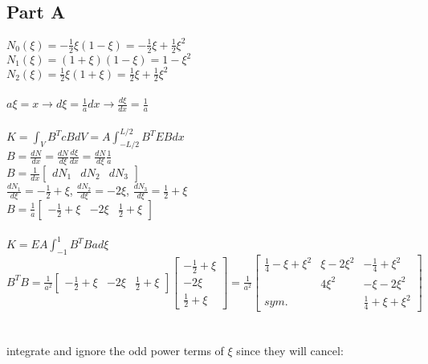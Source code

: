 \documentclass{article}
\begin{document}
\subsection*{Part A}
$N_0(\xi)=-\frac{1}{2}\xi(1-\xi)=-\frac{1}{2}\xi+\frac{1}{2}\xi^2$ \\
$N_1(\xi)=(1+\xi)(1-\xi)=1-\xi^2$ \\
$N_2(\xi)=\frac{1}{2}\xi(1+\xi)=\frac{1}{2}\xi+\frac{1}{2}\xi^2$ \\\\
$a\xi=x \rightarrow d\xi=\frac{1}{a}dx \rightarrow \frac{d\xi}{dx}=\frac{1}{a}$ \\\\
$K=\int_{V}B^TcBdV=A\int_{-L/2}^{L/2}B^TEBdx$ \\
$B=\frac{dN}{dx}=\frac{dN}{d\xi}\frac{d\xi}{dx}=\frac{dN}{d\xi}\frac{1}{a}$ \\
$B=\frac{1}{dx}\begin{bmatrix}
    dN_1 & dN_2 & dN_3
\end{bmatrix}$ \\
$\frac{dN_1}{d\xi}=-\frac{1}{2}+\xi$, \quad $\frac{dN_2}{d\xi}=-2\xi$, \quad $\frac{dN_3}{d\xi}
=\frac{1}{2}+\xi$ \\
$B=\frac{1}{a}\begin{bmatrix}
    -\frac{1}{2}+\xi & -2\xi & \frac{1}{2}+\xi
\end{bmatrix}$ \\\\
$K=EA\int_{-1}^{1}B^TB ad\xi$ \\
$B^TB=\frac{1}{a^2}\begin{bmatrix}
    -\frac{1}{2}+\xi & -2\xi & \frac{1}{2}+\xi
\end{bmatrix}\begin{bmatrix}
    -\frac{1}{2}+\xi \\ -2\xi \\ \frac{1}{2}+\xi
\end{bmatrix}=\frac{1}{a^2}\begin{bmatrix}
    \frac{1}{4}-\xi+\xi^2 & \xi-2\xi^2 & -\frac{1}{4}+\xi^2 \\
    & 4\xi^2 & -\xi-2\xi^2 \\
    sym. & & \frac{1}{4}+\xi+\xi^2
\end{bmatrix}$ \\\\\\
integrate and ignore the odd power terms of $\xi$ since they will cancel: \\\\
\end{document}
